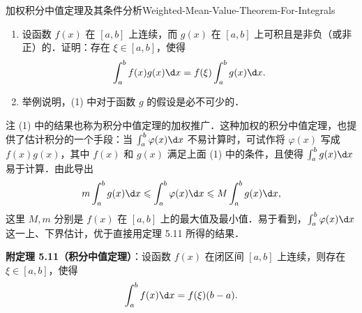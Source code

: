 \begin{problem}{加权积分中值定理及其条件分析}{Weighted-Mean-Value-Theorem-For-Integrals}
    \begin{enumerate}
        \item 设函数 $f(x)$ 在 $[a, b]$ 上连续，而 $g(x)$ 在 $[a, b]$ 上可积且是非负（或非正）的．证明：存在 $\xi \in [a, b]$，使得
              \begin{equation}
                  \int_a^b f(x)g(x)\d x = f(\xi)\int_a^b g(x)\d x.
              \end{equation}
        \item 举例说明，(1) 中对于函数 $g$ 的假设是必不可少的．
    \end{enumerate}
    注 (1) 中的结果也称为积分中值定理的加权推广．这种加权的积分中值定理，也提供了估计积分的一个手段：当 $\int_a^b \varphi(x)\d x$ 不易计算时，可试作将 $\varphi(x)$ 写成 $f(x)g(x)$，其中 $f(x)$ 和 $g(x)$ 满足上面 (1) 中的条件，且使得 $\int_a^b g(x)\d x$ 易于计算．由此导出
    \begin{equation}
        m \int_a^b g(x)\d x \leqslant \int_a^b \varphi(x)\d x \leqslant M \int_a^b g(x)\d x,
    \end{equation}
    这里 $M, m$ 分别是 $f(x)$ 在 $[a, b]$ 上的最大值及最小值．易于看到，$\int_a^b \varphi(x)\d x$ 这一上、下界估计，优于直接用定理 5.11 所得的结果．

    \textbf{附定理 5.11（积分中值定理）}：设函数 $f(x)$ 在闭区间 $[a, b]$ 上连续，则存在 $\xi \in [a, b]$，使得
    \begin{equation}
        \int_a^b f(x)\d x = f(\xi)(b-a).
    \end{equation}
\end{problem}

